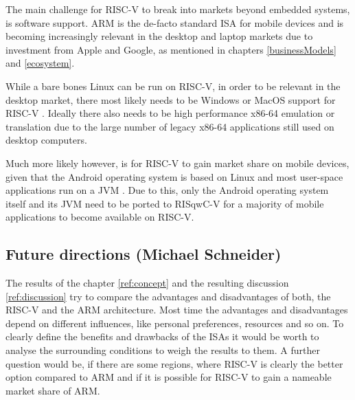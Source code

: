 \documentclass[conference]{IEEEtran}
\begin{document}
	The main challenge for RISC-V to break into markets beyond embedded systems, is software support.
	ARM is the de-facto standard \gls{ISA} for mobile devices and is becoming increasingly relevant in the desktop and laptop markets
	due to investment from Apple and Google, as mentioned in chapters \ref{businessModels} and \ref{ecosystem}.

	While a bare bones Linux can be run on RISC-V, in order to be relevant in the desktop market, there most likely
	needs to be Windows or MacOS support for RISC-V \cite{StatCounter2020}. Ideally there also needs to be high performance
	x86-64 emulation or translation due to the large number of legacy x86-64 applications still used on desktop computers.

	Much more likely however, is for RISC-V to gain market share on mobile devices, given that the Android operating system
	is based on Linux and most user-space applications run on a \gls{JVM} \cite{Ehringer2010}.
	Due to this, only the Android operating system itself and its \gls{JVM} need to be ported to RISqwC-V for a majority
	of mobile applications to become available on RISC-V.

	\subsection{Future directions (Michael Schneider)}

	The results of the chapter \ref{ref:concept} and the resulting discussion \ref{ref:discussion} try to compare the advantages and disadvantages of both, the RISC-V and the ARM architecture. Most time the advantages and disadvantages depend on different influences, like personal preferences, resources and so on. To clearly define the benefits and drawbacks of the \glspl{ISA} it would be worth to analyse the surrounding conditions to weigh the results to them. A further question would be, if there are some regions, where RISC-V is clearly the better option compared to ARM and if it is possible for RISC-V to gain a nameable market share of ARM. 
\end{document}
